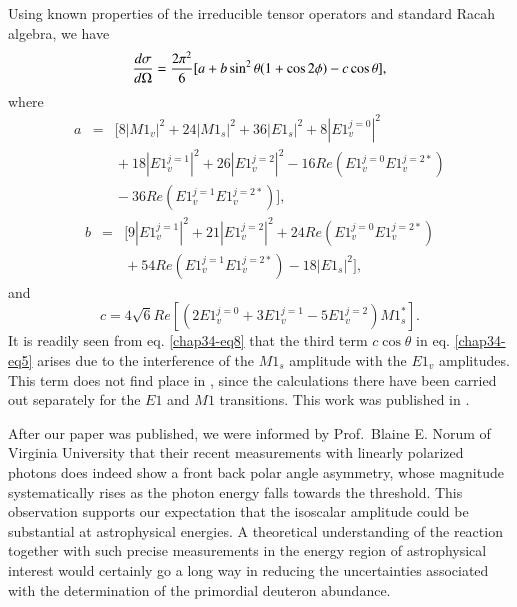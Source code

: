 Using known properties \cite{chap34-key52} of the irreducible tensor operators and
standard Racah algebra, we have
\begin{equation}
{d\sigma \over d\Omega}={2\pi^2 \over 6} [a+b \sin^2\theta (1+\cos 2\phi) -c\cos\theta],\label{chap34-eq5}
\end{equation}
where 
\begin{eqnarray}
a &=& \big[ 8 |M1_v|^2+ 24|M1_s|^2 + 36|E1_s|^2 + 8 |E1_v^{j=0}|^2 \nonumber \\ 
	&&{}+18 |E1_v^{j=1}|^2 + 26 |E1_v^{j=2}|^2 -16 Re(E1_v^{j=0} E1_v^{j=2*}) \nonumber \\ 
	&&{}-36 Re(E1_v^{j=1} E1_v^{j=2*}) \big], \label{chap34-eq6}
\end{eqnarray}
\begin{eqnarray}
 b &=& \big[ 9 |E1_v^{j=1}|^2+21 |E1_v^{j=2}|^2 +24 Re(E1_v^{j=0} E1_v^{j=2*}) \nonumber \\
&&{}+54 Re(E1_v^{j=1} E1_v^{j=2*})-18|E1_s|^2 \big], \label{chap34-eq7}
\end{eqnarray}
and
\begin{equation}
c = 4\sqrt 6 Re \left[(2 E1_v^{j=0} + 3 E1_v^{j=1} -5 E1_v^{j=2})M1_s^*\right] \label{chap34-eq8}.
\end{equation}
It is readily seen from  eq. \eqref{chap34-eq8} that the third term $c \cos\theta$ in eq. \eqref{chap34-eq5} arises due to the interference of the $M1_s$ amplitude with the $E1_v$ amplitudes. This term does not find place in \cite{chap34-key49}, since the calculations there have been carried out separately for the $E1$ and $M1$ transitions.  This work was published in \cite{chap34-key54}.

After our paper was published, we were informed \cite{chap34-key55} by Prof.\ Blaine E. Norum of Virginia University that their recent measurements \cite{chap34-key56} with linearly polarized photons does indeed show a front back polar angle asymmetry, whose magnitude systematically rises as the photon energy falls towards the threshold. This observation supports our expectation that the isoscalar amplitude could be substantial at astrophysical energies. A theoretical understanding of the reaction together with such precise measurements in  the energy region of astrophysical interest  would certainly go a long way in reducing the uncertainties associated with the determination of the primordial deuteron abundance. 

